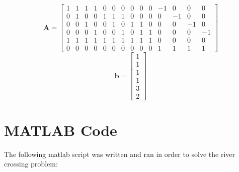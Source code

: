 \documentclass{article}
\begin{document}
\begin{equation} \label{eq:const-matrix}
\mathbf{A} = \begin{bmatrix}
1 & 1 & 1 & 1 & 0 & 0 & 0 & 0 & 0 & 0 & -1 & 0 & 0 & 0 \\ \hline
0 & 1 & 0 & 0 & 1 & 1 & 1 & 0 & 0 & 0 & 0 & -1 & 0 & 0 \\ \hline
0 & 0 & 1 & 0 & 0 & 1 & 0 & 1 & 1 & 0 & 0 & 0 & -1 & 0 \\ \hline
0 & 0 & 0 & 1 & 0 & 0 & 1 & 0 & 1 & 1 & 0 & 0 & 0 & -1 \\ \hline
1 & 1 & 1 & 1 & 1 & 1 & 1 & 1 & 1 & 1 & 0 & 0 & 0 & 0 \\ \hline
0 & 0 & 0 & 0 & 0 & 0 & 0 & 0 & 0 & 0 & 1 & 1 & 1 & 1
\end{bmatrix}
\end{equation}
\begin{equation*} \label{eq:const-vec}
\mathbf{b} = \begin{bmatrix}
1 \\ 1 \\ 1 \\ 1 \\ 3 \\ 2
\end{bmatrix}
\end{equation*}

\section{MATLAB Code}

The following matlab script was written and ran in order to solve the river crossing problem:
\end{document}
